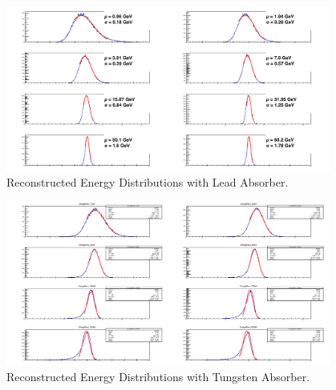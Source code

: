  \begin{figure}[hbp]
    \centering
    \includegraphics[width=0.95\textwidth]{figures/ch_simulations/hgc/performance/Pb/EnergyRECO.png}
    \caption{Reconstructed Energy Distributions with Lead Absorber.}
    \label{fig:simulations_hgc_pbenergyreco}
 \end{figure}

  \begin{figure}[hbp]
    \centering
    \includegraphics[width=0.95\textwidth]{figures/ch_simulations/hgc/performance/W/EnergyRECO.png}
    \caption{Reconstructed Energy Distributions with Tungsten Absorber.}
    \label{fig:simulations_hgc_wenergyreco}
 \end{figure}

